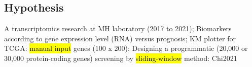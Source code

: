 \documentclass[
paper=landscape,
paper=160mm:90mm, %
fontsize=11pt, %
pagesize, %
parskip=half-, %
]{scrartcl} %
\theoremstyle{mythmstyle} %
\begin{document}
\clearpage
\subsection{Hypothesis} 
\begin{outline}

\1 A transcriptomics research at MH laboratory (2017 to 2021);
\1 Biomarkers according to gene expression level (RNA) versus prognosis;
\1 KM plotter for TCGA: \hl{manual input} genes (100 x 200);
\1 Designing a programmatic (20,000 or 30,000 protein-coding genes) screening by \hl{sliding-window} method: Chi2021~\autocite{Chi2021}
\end{outline}

\thispagestyle{headings}
\end{document}
